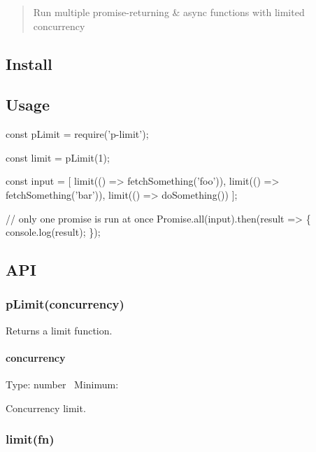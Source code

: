 \begin{quote}
Run multiple promise-\/returning \& async functions with limited concurrency \end{quote}


\subsection*{Install}




\subsection*{Usage}


\begin{DoxyCode}
const pLimit = require('p-limit');

const limit = pLimit(1);

const input = [
    limit(() => fetchSomething('foo')),
    limit(() => fetchSomething('bar')),
    limit(() => doSomething())
];

// only one promise is run at once
Promise.all(input).then(result => \{
    console.log(result);
\});
\end{DoxyCode}


\subsection*{A\+PI}

\subsubsection*{p\+Limit(concurrency)}

Returns a {\ttfamily limit} function.

\paragraph*{concurrency}

Type\+: {\ttfamily number}~\newline
 Minimum\+: {}

Concurrency limit.

\subsubsection*{limit(fn)}

